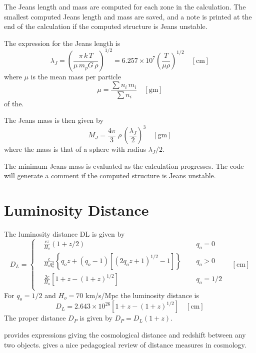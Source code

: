 The Jeans length and mass are computed for each zone in the calculation.
The smallest computed Jeans length and mass are saved, and a note is printed
at the end of the calculation if the computed structure is Jeans unstable.

The expression for the Jeans length is
\begin{equation}
{\lambda _J} = {\left( {\frac{{\pi \,k\,T}}{{\mu \,{m_p}G\,\rho }}}
\right)^{1/2}} = 6.257 \times {10^7}{\left( {\frac{T}{{\mu \rho }}}
\right)^{1/2}}
\quad [\mathrm{cm}]
\end{equation}
where $\mu$ is the mean mass per particle
\begin{equation}
\mu  = \frac{{\sum {{n_i}\,{m_i}} }}{{\sum {{n_i}} }}
\quad [\mathrm{gm}]
\end{equation}
of the.

The Jeans mass is then given by
\begin{equation}
{M_J} = \frac{{4\pi }}{3}\;\rho \,{\left( {\frac{{{\lambda _J}}}{2}}
\right)^3}
\quad [\mathrm{gm}]
\end{equation}
where the mass is that of a sphere with radius $\lambda_J /2$.

The minimum Jeans mass is evaluated as the calculation progresses.  The
code will generate a comment if the computed structure is Jeans unstable.

\section{Luminosity Distance}

The luminosity distance DL is given by
\begin{equation}
{D_L} = \left\{ \begin{array}{ccccc}
& \frac{{cz}}{{{H_o}}}\left( {1 + z/2} \right)& {q_o} = 0 \\
& \frac{c}{{{H_o}q_o^2}}\left\{ {{q_o}z + \left( {{q_o} - 1} \right)\left[
{{{\left( {2{q_o}z + 1} \right)}^{1/2}} - 1} \right]} \right\}\quad \,\,
& {q_o} > 0 \\
& \frac{{2c}}{{{H_o}}}\left[ {1 + z - {{\left( {1 + z} \right)}^{1/2}}}
\right]& {q_o} = 1/2 \\
 \end{array} \right.
\quad [\mathrm{cm}]
\end{equation}
For $q_o=1/2$ and $H_o = 70$ km/s/Mpc the luminosity distance is
\begin{equation}
{D_L} = 2.643 \times {10^{26}}\left[ {1 + z - {{\left( {1 + z}
\right)}^{1/2}}} \right]
\quad  [\mathrm{cm}]
\end{equation}
The proper distance $D_P$ is given by ${D_P} = {D_L}\left( {1 + z} \right)$.

\citet{Liske2000} provides expressions giving the cosmological distance and
redshift between any two objects.
\citet{Hogg1999} gives a nice pedagogical
review of distance measures in cosmology.

